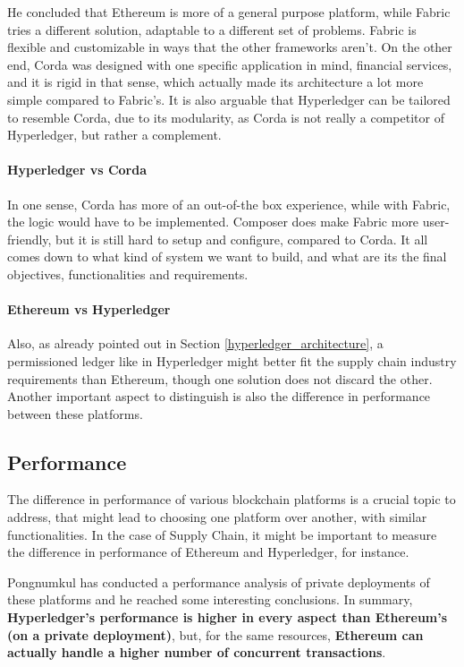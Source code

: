 He concluded that Ethereum is more of a general purpose platform, while Fabric tries a different solution, adaptable to a different set of problems. Fabric is flexible and customizable in ways that the other frameworks aren't. On the other end, Corda  was designed with one specific application in mind, financial services, and it is rigid in that sense, which actually made its architecture a lot more simple compared to Fabric's. It is also arguable that Hyperledger can be tailored to resemble Corda, due to its modularity, as Corda is not really a competitor of Hyperledger, but rather a complement. 

\paragraph{Hyperledger vs Corda} In one sense, Corda has more of an out-of-the box experience, while with Fabric, the logic would have to be implemented. Composer does make Fabric more user-friendly, but it is still hard to setup and configure, compared to Corda. It all comes down to what kind of system we want to build, and what are its the final objectives, functionalities and requirements.

\paragraph{Ethereum vs Hyperledger} Also, as already pointed out in Section \ref{hyperledger_architecture}, a permissioned ledger like in Hyperledger might better fit the supply chain industry requirements than Ethereum, though one solution does not discard the other. Another important aspect to distinguish is also the difference in performance between these platforms.



\subsection{Performance}
\label{sec-performance-comparison}
The difference in performance of various blockchain platforms is a crucial topic to address, that might lead to choosing one platform over another, with similar functionalities. In the case of Supply Chain, it might be important to measure the difference in performance of Ethereum and Hyperledger, for instance. 

Pongnumkul has conducted a performance analysis of private deployments of these platforms \cite{Pongnumkul2017} and he reached some interesting conclusions. In summary, \textbf{Hyperledger's performance is higher in every aspect than Ethereum's (on a private deployment)}, but, for the same resources, \textbf{Ethereum can actually handle a higher number of concurrent transactions}. 

